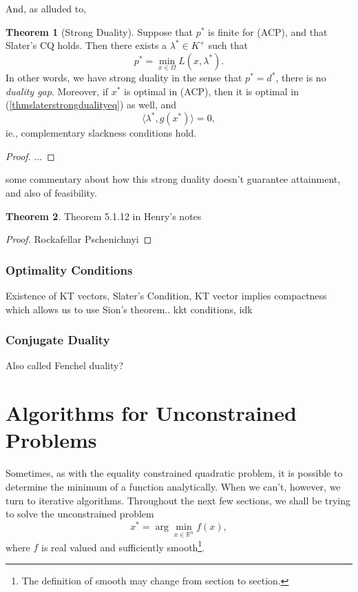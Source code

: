 \documentclass[11pt]{article}
\numberwithin{equation}{section}
\theoremstyle{definition}
\newtheorem{theorem}{Theorem}[section]
\newcommand{\bR}{\mathbb{R}}
\begin{document}
And, as alluded to,
\begin{theorem}[Strong Duality]
    Suppose that $p^*$ is finite for (ACP), and that Slater's CQ holds. Then there exists a $\lambda^*\in K^+$ such that
    \begin{equation}
        \label{thmslaterstrongdualityeq}
        p^*=\min_{x\in\Omega} L(x,\lambda^*).
    \end{equation}
    In other words, we have strong duality in the sense that $p^*=d^*$, there is no \textit{duality gap}. Moreover, if $x^*$ is optimal in (ACP), then it is optimal in (\ref{thmslaterstrongdualityeq}) as well, and
    \begin{equation}
        \langle \lambda^*,g(x^*)\rangle=0,
    \end{equation}
    ie., complementary slackness conditions hold.
\end{theorem}
\begin{proof}
...
\end{proof}
some commentary about how this strong duality doesn't guarantee attainment, and also of feasibility.
\begin{theorem}
    Theorem 5.1.12 in Henry's notes
\end{theorem}
\begin{proof}
    Rockafellar Pschenichnyi
\end{proof}
\subsubsection{Optimality Conditions}

Existence of KT vectors, Slater's Condition, KT vector implies compactness which allows us to use Sion's theorem.. kkt conditions, idk
\subsubsection{Conjugate Duality}
Also called Fenchel duality?
\section{Algorithms for Unconstrained Problems}
Sometimes, as with the equality constrained quadratic problem, it is possible to determine the minimum of a function analytically. When we can't, however, we turn to iterative algorithms. Throughout the next few sections, we shall be trying to solve the unconstrained problem
\begin{equation}x^*=\arg\min_{x\in\bR^n} f(x),\end{equation}
where $f$ is real valued and sufficiently smooth\footnote{The definition of smooth may change from section to section.}.
\end{document}
